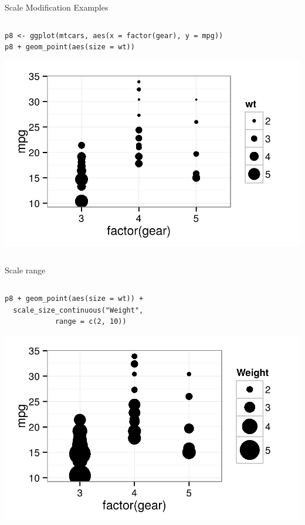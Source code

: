 \documentclass[table,smaller]{beamer}
\begin{document}
\begin{frame}[fragile,label=sec-4-7]{Scale Modification Examples}
 \begin{columns}  \begin{block}{}

\begin{verbatim}
p8 <- ggplot(mtcars, aes(x = factor(gear), y = mpg))
p8 + geom_point(aes(size = wt))
\end{verbatim}

\includegraphics[width=.9\linewidth]{images/modifyScales5.png}

\end{block} \end{columns}
\end{frame}

\begin{frame}[fragile,label=sec-4-8]{Scale range}
 \begin{columns}  \begin{block}{}

\begin{verbatim}
p8 + geom_point(aes(size = wt)) +
  scale_size_continuous("Weight",
			range = c(2, 10))
\end{verbatim}

\includegraphics[width=.9\linewidth]{images/modifyScales6.png}

\end{block} \end{columns}
\end{frame}
\end{document}
